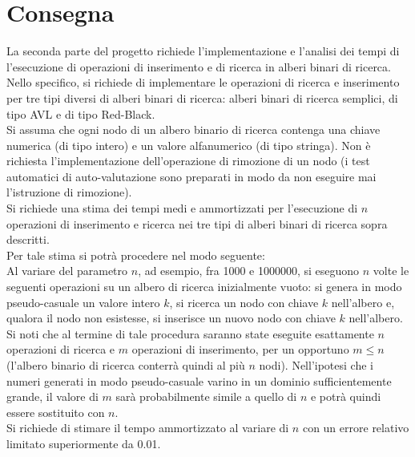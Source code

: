 \documentclass[a4paper,11pt]{report}
\begin{document}
    \chapter{Consegna}
    La seconda parte del progetto richiede l'implementazione e l'analisi dei tempi di l'esecuzione di operazioni di inserimento e di ricerca in alberi binari di ricerca. Nello specifico, si richiede di implementare le operazioni di ricerca e inserimento per tre tipi diversi di alberi binari di ricerca: alberi binari di ricerca semplici, di tipo AVL e di tipo Red-Black.
    \\Si assuma che ogni nodo di un albero binario di ricerca contenga una chiave numerica (di tipo intero) e un valore alfanumerico (di tipo stringa). Non è richiesta l'implementazione dell'operazione di rimozione di un nodo (i test automatici di auto-valutazione sono preparati in modo da non eseguire mai l'istruzione di rimozione).
    \vspace{2mm}
    \\Si richiede una stima dei tempi medi e ammortizzati per l'esecuzione di $n$ operazioni di inserimento e ricerca nei tre tipi di alberi binari di ricerca sopra descritti.
    \\Per tale stima si potrà procedere nel modo seguente:
    \\Al variare del parametro $n$, ad esempio, fra 1000 e 1000000, si eseguono $n$ volte le seguenti operazioni su un albero di ricerca inizialmente vuoto: si genera in modo pseudo-casuale un valore intero $k$, si ricerca un nodo con chiave $k$ nell'albero e, qualora il nodo non esistesse, si inserisce un nuovo nodo con chiave $k$ nell'albero. Si noti che al termine di tale procedura saranno state eseguite esattamente $n$ operazioni di ricerca e $m$ operazioni di inserimento, per un opportuno $m \le n$ (l'albero binario di ricerca conterrà quindi al più $n$ nodi). Nell'ipotesi che i numeri generati in modo pseudo-casuale varino in un dominio sufficientemente grande, il valore di $m$ sarà probabilmente simile a quello di $n$ e potrà quindi essere sostituito con $n$.
    \vspace{2mm}
    \\Si richiede di stimare il tempo ammortizzato al variare di $n$ con un errore relativo limitato superiormente da 0.01.
\end{document}
